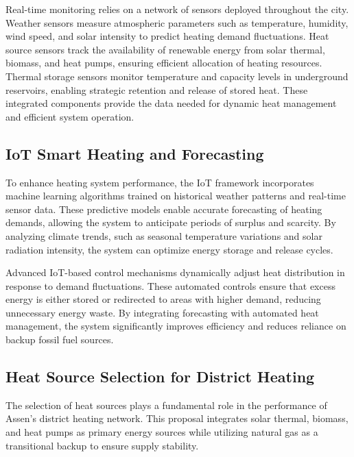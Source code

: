 \documentclass[conference]{IEEEtran}
\begin{document}
Real-time monitoring relies on a network of sensors deployed throughout the city. Weather sensors measure atmospheric parameters such as temperature, humidity, wind speed, and solar intensity to predict heating demand fluctuations. Heat source sensors track the availability of renewable energy from solar thermal, biomass, and heat pumps, ensuring efficient allocation of heating resources. Thermal storage sensors monitor temperature and capacity levels in underground reservoirs, enabling strategic retention and release of stored heat. These integrated components provide the data needed for dynamic heat management and efficient system operation.

\subsection{IoT Smart Heating and Forecasting}

To enhance heating system performance, the IoT framework incorporates machine learning algorithms trained on historical weather patterns and real-time sensor data. These predictive models enable accurate forecasting of heating demands, allowing the system to anticipate periods of surplus and scarcity. By analyzing climate trends, such as seasonal temperature variations and solar radiation intensity, the system can optimize energy storage and release cycles.

Advanced IoT-based control mechanisms dynamically adjust heat distribution in response to demand fluctuations. These automated controls ensure that excess energy is either stored or redirected to areas with higher demand, reducing unnecessary energy waste. By integrating forecasting with automated heat management, the system significantly improves efficiency and reduces reliance on backup fossil fuel sources.


\subsection{Heat Source Selection for District Heating}

The selection of heat sources plays a fundamental role in the performance of Assen’s district heating network. This proposal integrates solar thermal, biomass, and heat pumps as primary energy sources while utilizing natural gas as a transitional backup to ensure supply stability.
\end{document}

